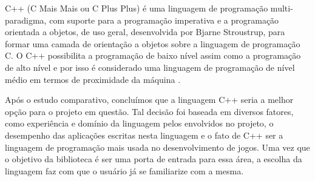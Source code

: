 %
C++ (C Mais Mais ou C Plus Plus) é uma linguagem de programação multi-paradigma, com suporte para a programação imperativa e a programação orientada a objetos, de uso geral, desenvolvida por Bjarne Stroustrup, para formar uma camada de orientação a objetos sobre a linguagem de programação C. O C++ possibilita a programação de baixo nível assim como a programação de alto nível e por isso é considerado uma linguagem de programação de nível médio em termos de proximidade da máquina \cite{Mizrahi} .
\par
Após o estudo comparativo, concluímos que a linguagem C++ seria a melhor opção para o projeto em questão. Tal decisão foi baseada em diversos fatores, como experiência e domínio da linguagem pelos envolvidos no projeto, o desempenho das aplicações escritas nesta linguagem e o fato de C++ ser a linguagem de programação mais usada no desenvolvimento de jogos. Uma vez que o objetivo da biblioteca é ser uma porta de entrada para essa área, a escolha da linguagem faz com que o usuário já se familiarize com a mesma. %
%
%
